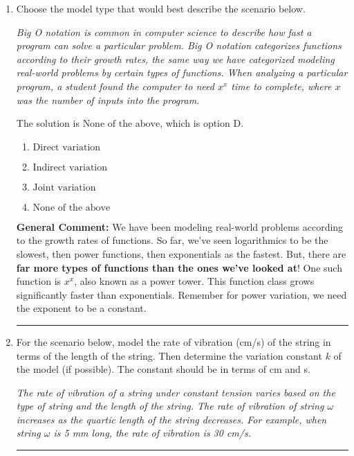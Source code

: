 \documentclass{extbook}[14pt]
\newcommand{\litem}[1]{\item #1

\rule{\textwidth}{0.4pt}}
\begin{document}
\begin{enumerate}\litem{
Choose the model type that would best describe the scenario below.

\begin{center}
    \textit{ Big O notation is common in computer science to describe how fast a program can solve a particular problem. Big O notation categorizes functions according to their growth rates, the same way we have categorized modeling real-world problems by certain types of functions. When analyzing a particular program, a student found the computer to need $x^x$ time to complete, where $x$ was the number of inputs into the program. }
\end{center}


The solution is \( \text{None of the above} \), which is option D.\begin{enumerate}[label=\Alph*.]
\item \( \text{Direct variation} \)


\item \( \text{Indirect variation} \)


\item \( \text{Joint variation} \)


\item \( \text{None of the above} \)


\end{enumerate}

\textbf{General Comment:} We have been modeling real-world problems according to the growth rates of functions. So far, we've seen logarithmics to be the slowest, then power functions, then exponentials as the fastest. But, there are \textbf{far more types of functions than the ones we've looked at}! One such function is $x^x$, also known as a power tower. This function class grows significantly faster than exponentials. Remember for power variation, we need the exponent to be a constant.
}
\litem{
For the scenario below, model the rate of vibration (cm/s) of the string in terms of the length of the string. Then determine the variation constant $k$ of the model (if possible). The constant should be in terms of cm and s.

\begin{center}
    \textit{ The rate of vibration of a string under constant tension varies based on the type of string and the length of the string. The rate of vibration of string $\omega$ increases as the quartic length of the string decreases. For example, when string $\omega$ is 5 mm long, the rate of vibration is 30 cm/s. }
\end{center}


}
\end{enumerate}
\end{document}
